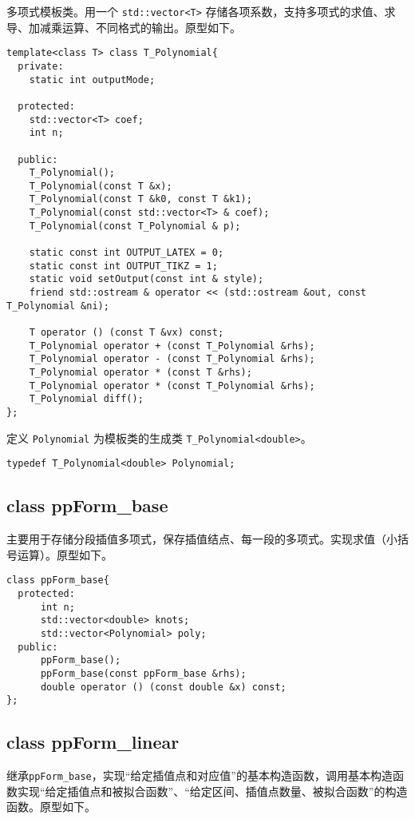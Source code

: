 \documentclass[lang=cn,11pt,a4paper]{elegantpaper}
\begin{document}
多项式模板类。用一个 \verb|std::vector<T>| 存储各项系数，支持多项式的求值、求导、加减乘运算、不同格式的输出。原型如下。

\begin{lstlisting}
template<class T> class T_Polynomial{
  private:
    static int outputMode;

  protected:
    std::vector<T> coef;
    int n;

  public:
    T_Polynomial();
    T_Polynomial(const T &x);
    T_Polynomial(const T &k0, const T &k1);
    T_Polynomial(const std::vector<T> & coef);
    T_Polynomial(const T_Polynomial & p);

    static const int OUTPUT_LATEX = 0;
    static const int OUTPUT_TIKZ = 1;
    static void setOutput(const int & style);
    friend std::ostream & operator << (std::ostream &out, const T_Polynomial &ni);
    
    T operator () (const T &vx) const;
    T_Polynomial operator + (const T_Polynomial &rhs);
    T_Polynomial operator - (const T_Polynomial &rhs);
    T_Polynomial operator * (const T &rhs);
    T_Polynomial operator * (const T_Polynomial &rhs);
    T_Polynomial diff();
};
\end{lstlisting}

定义 \verb|Polynomial| 为模板类的生成类 \verb|T_Polynomial<double>|。

\begin{lstlisting}
typedef T_Polynomial<double> Polynomial;
\end{lstlisting}

\subsection{class ppForm\_base}

主要用于存储分段插值多项式，保存插值结点、每一段的多项式。实现求值（小括号运算）。原型如下。

\begin{lstlisting}
class ppForm_base{
  protected:
      int n;
      std::vector<double> knots;
      std::vector<Polynomial> poly;
  public:
      ppForm_base();
      ppForm_base(const ppForm_base &rhs);
      double operator () (const double &x) const;
};
\end{lstlisting}

\subsection{class ppForm\_linear}

继承\verb|ppForm_base|，实现“给定插值点和对应值”的基本构造函数，调用基本构造函数实现“给定插值点和被拟合函数”、“给定区间、插值点数量、被拟合函数”的构造函数。原型如下。
\end{document}

